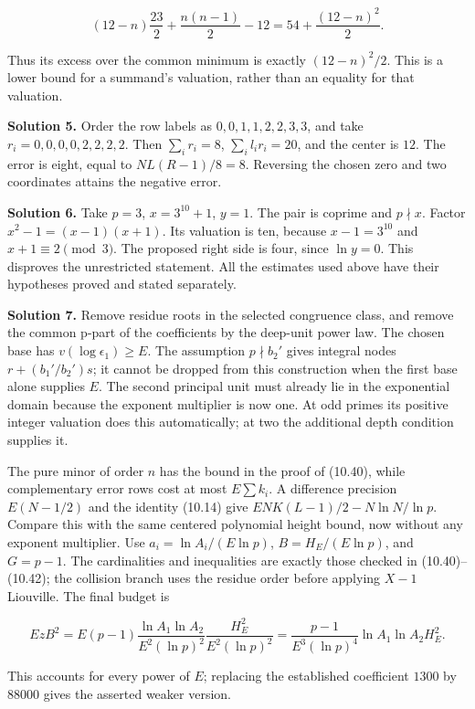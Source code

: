 \documentclass[
  11pt,
  a4paper,
]{article}
\begin{document}
\[
(12-n)\frac{23}{2}+\frac{n(n-1)}2-12
=54+\frac{(12-n)^2}2.
\]

Thus its excess over the common minimum is exactly \((12-n)^2/2\). This
is a lower bound for a summand's valuation, rather than an equality for
that valuation.

\textbf{Solution 5.} Order the row labels as \(0,0,1,1,2,2,3,3\), and
take \(r_i=0,0,0,0,2,2,2,2\). Then \(\sum_i r_i=8\),
\(\sum_i l_ir_i=20\), and the center is \(12\). The error is eight,
equal to \(NL(R-1)/8=8\). Reversing the chosen zero and two coordinates
attains the negative error.

\textbf{Solution 6.} Take \(p=3\), \(x=3^{10}+1\), \(y=1\). The pair is
coprime and \(p\nmid x\). Factor \(x^2-1=(x-1)(x+1)\). Its valuation is
ten, because \(x-1=3^{10}\) and \(x+1\equiv2\pmod3\). The proposed right
side is four, since \(\ln y=0\). This disproves the unrestricted
statement. All the estimates used above have their hypotheses proved and
stated separately.

\textbf{Solution 7.} Remove residue roots in the selected congruence
class, and remove the common p-part of the coefficients by the deep-unit
power law. The chosen base has \(v(\log\epsilon_1)\ge E\). The
assumption \(p\nmid b_2'\) gives integral nodes \(r+(b_1'/b_2')s\); it
cannot be dropped from this construction when the first base alone
supplies \(E\). The second principal unit must already lie in the
exponential domain because the exponent multiplier is now one. At odd
primes its positive integer valuation does this automatically; at two
the additional depth condition supplies it.

The pure minor of order \(n\) has the bound in the proof of (10.40),
while complementary error rows cost at most \(E\sum k_i\). A difference
precision \(E(N-1/2)\) and the identity (10.14) give
\(ENK(L-1)/2-N\ln N/\ln p\). Compare this with the same centered
polynomial height bound, now without any exponent multiplier. Use
\(a_i=\ln A_i/(E\ln p)\), \(B=H_E/(E\ln p)\), and \(G=p-1\). The
cardinalities and inequalities are exactly those checked in
(10.40)--(10.42); the collision branch uses the residue order before
applying \(X-1\) Liouville. The final budget is

\[
EzB^2
=E(p-1)\frac{\ln A_1\ln A_2}{E^2(\ln p)^2}
\frac{H_E^2}{E^2(\ln p)^2}
=\frac{p-1}{E^3(\ln p)^4}\ln A_1\ln A_2H_E^2.
\]

This accounts for every power of \(E\); replacing the established
coefficient \(1300\) by \(88000\) gives the asserted weaker version.
\end{document}

